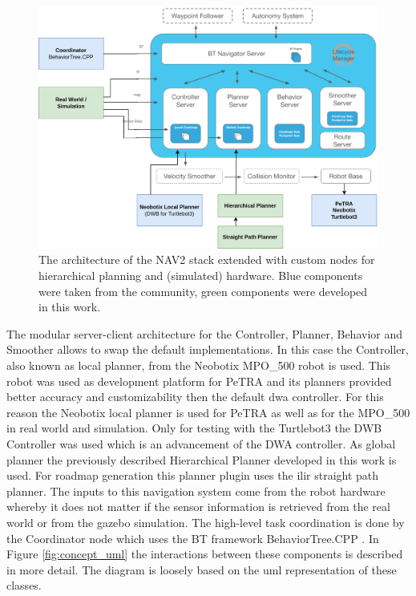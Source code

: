\begin{figure}[h]
    \centering
    \includegraphics[width=\textwidth]{figures/40_concept/concept_nav2.png}
    \caption[The architecture of the NAV2 stack extended with custom nodes for hierarchical planning and (simulated) hardware]{The architecture of the NAV2 stack extended with custom nodes for hierarchical planning and (simulated) hardware. Blue components were taken from the community, green components were developed in this work.}
    \label{fig:concept_nav2}
\end{figure}

The modular server-client architecture for the Controller, Planner, Behavior and Smoother allows to swap the default implementations. In this case the Controller, also known as local planner, from the Neobotix MPO\_500 robot is used. This robot was used as development platform for PeTRA and its planners provided better accuracy and customizability then the default \gls{dwa} controller. For this reason the Neobotix local planner \cite{pradheep_krishna_neobotixneo_local_planner2_2021} is used for PeTRA as well as for the MPO\_500 in real world and simulation. Only for testing with the Turtlebot3 the DWB Controller was used which is an advancement of the DWA controller. As global planner the previously described Hierarchical Planner developed in this work is used. For roadmap generation this planner plugin uses the \gls{ilir} straight path planner. The inputs to this navigation system come from the robot hardware whereby it does not matter if the sensor information is retrieved from the real world or from the gazebo simulation. The high-level task coordination is done by the Coordinator node which uses the BT framework BehaviorTree.CPP \cite{auryn_robotics_behaviortreecpp_2023}. In Figure \ref{fig:concept_uml} the interactions between these components is described in more detail. The diagram is loosely based on the \gls{uml} representation of these classes.

